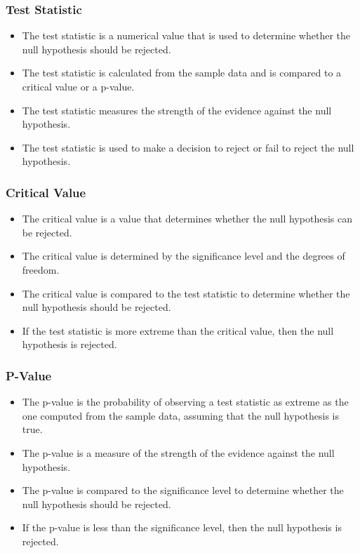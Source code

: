 \documentclass[serif, 9pt, aspectratio=32]{beamer}
\begin{document}
\begin{frame}
    \frametitle{Test Statistic}
    \begin{itemize}
        \setlength{\itemsep}{2em}
        \item The test statistic is a numerical value that is used to determine whether the null hypothesis should be rejected.
        \item The test statistic is calculated from the sample data and is compared to a critical value or a p-value.
        \item The test statistic measures the strength of the evidence against the null hypothesis.
        \item The test statistic is used to make a decision to reject or fail to reject the null hypothesis.
    \end{itemize}
\end{frame}

\begin{frame}
    \frametitle{Critical Value}
    \begin{itemize}
        \setlength{\itemsep}{2em}
        \item The critical value is a value that determines whether the null hypothesis can be rejected.
        \item The critical value is determined by the significance level and the degrees of freedom.
        \item The critical value is compared to the test statistic to determine whether the null hypothesis should be rejected.
        \item If the test statistic is more extreme than the critical value, then the null hypothesis is rejected.
    \end{itemize}
\end{frame}

\begin{frame}
    \frametitle{P-Value}
    \begin{itemize}
        \setlength{\itemsep}{2em}
        \item The p-value is the probability of observing a test statistic as extreme as the one computed from the sample data, assuming that the null hypothesis is true.
        \item The p-value is a measure of the strength of the evidence against the null hypothesis.
        \item The p-value is compared to the significance level to determine whether the null hypothesis should be rejected.
        \item If the p-value is less than the significance level, then the null hypothesis is rejected.
    \end{itemize}
\end{frame}
\end{document}
